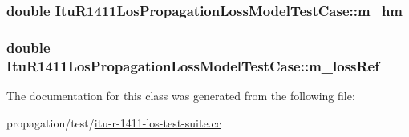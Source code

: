 \subsubsection[{\texorpdfstring{m\+\_\+hm}{m_hm}}]{\setlength{\rightskip}{0pt plus 5cm}double Itu\+R1411\+Los\+Propagation\+Loss\+Model\+Test\+Case\+::m\+\_\+hm\hspace{0.3cm}{\ttfamily [private]}}\hypertarget{classItuR1411LosPropagationLossModelTestCase_acd72ea952850549a2be01556832a01e1}{}\label{classItuR1411LosPropagationLossModelTestCase_acd72ea952850549a2be01556832a01e1}
\subsubsection[{\texorpdfstring{m\+\_\+loss\+Ref}{m_lossRef}}]{\setlength{\rightskip}{0pt plus 5cm}double Itu\+R1411\+Los\+Propagation\+Loss\+Model\+Test\+Case\+::m\+\_\+loss\+Ref\hspace{0.3cm}{\ttfamily [private]}}\hypertarget{classItuR1411LosPropagationLossModelTestCase_a30cbf5ac9194d5c16dace531cd87898b}{}\label{classItuR1411LosPropagationLossModelTestCase_a30cbf5ac9194d5c16dace531cd87898b}


The documentation for this class was generated from the following file\+:\begin{DoxyCompactItemize}
\item 
propagation/test/\hyperlink{itu-r-1411-los-test-suite_8cc}{itu-\/r-\/1411-\/los-\/test-\/suite.\+cc}\end{DoxyCompactItemize}
